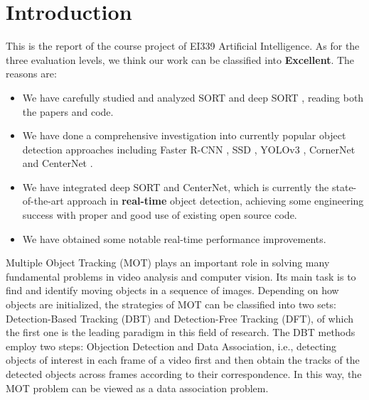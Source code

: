 \documentclass[conference]{IEEEtran}
\begin{document}





\section{Introduction}

This is the report of the course project of EI339 Artificial Intelligence. As for the three evaluation levels, we think our work can be classified into \textbf{Excellent}. The reasons are:
\begin{itemize}
    \item We have carefully studied and analyzed SORT \cite{Wojke2017simple} and deep SORT \cite{Wojke2018deep}, reading both the papers and code.
    \item We have done a comprehensive investigation into currently popular object detection approaches including Faster R-CNN \cite{ren2015faster}, SSD \cite{liu2016ssd}, YOLOv3 \cite{redmon2018yolov3}, CornerNet \cite{law2018cornernet} and CenterNet \cite{zhou2019objects}.
    \item We have integrated deep SORT and CenterNet, which is currently the state-of-the-art approach in \textbf{real-time} object detection, achieving some engineering success with proper and good use of existing open source code.
    \item We have obtained some notable real-time performance improvements.
\end{itemize}

Multiple Object Tracking (MOT) plays an important role in solving many fundamental problems in video analysis and computer vision. Its main task is to find and identify moving objects in a sequence of images. Depending on how objects are initialized, the strategies of MOT can be classified into two sets: Detection-Based Tracking (DBT) and Detection-Free Tracking (DFT), of which the first one is the leading paradigm in this field of research. The DBT methods employ two steps: Objection Detection and Data Association, i.e., detecting objects of interest in each frame of a video first and then obtain the tracks of the detected objects across frames according to their correspondence. In this way, the MOT problem can be viewed as a data association problem.
\end{document}
